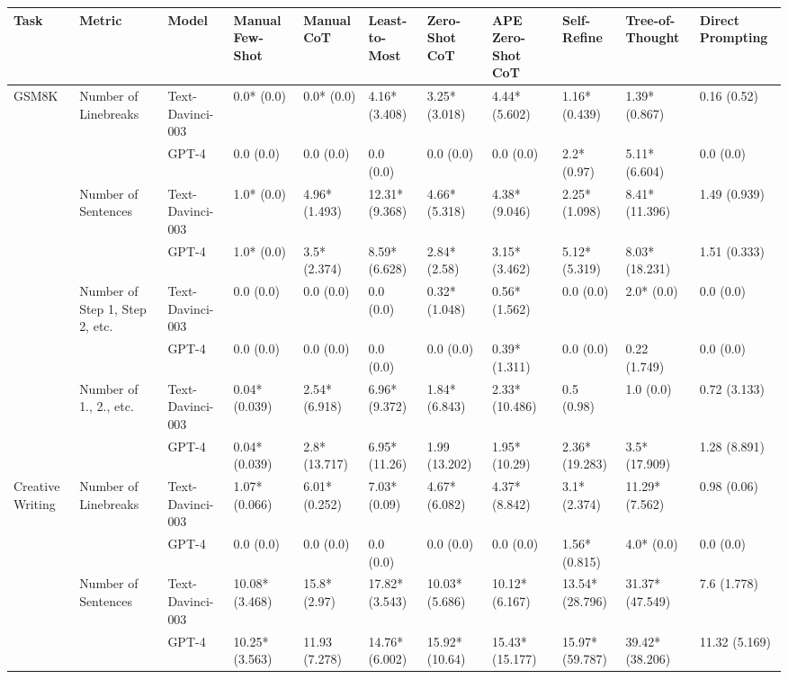 \begin{tabular}{x{0.75cm}|x{1.5cm}|x{0.75cm}|x{0.75cm}|x{0.75cm}|x{0.75cm}|x{0.75cm}|x{0.75cm}|x{0.75cm}|x{0.75cm}|x{0.75cm}}
\toprule
\hline
Task & Metric & Model & Manual Few-Shot & Manual CoT & Least-to-Most & Zero-Shot CoT & APE Zero-Shot CoT & Self-Refine & Tree-of-Thought & Direct Prompting \\
\hline
\midrule
GSM8K & Number of Linebreaks & Text-Davinci-003 & 0.0* (0.0) & 0.0* (0.0) & 4.16* (3.408) & 3.25* (3.018) & 4.44* (5.602) & 1.16* (0.439) & 1.39* (0.867) & 0.16 (0.52) \\
\hline
 &  & GPT-4 & 0.0 (0.0) & 0.0 (0.0) & 0.0 (0.0) & 0.0 (0.0) & 0.0 (0.0) & 2.2* (0.97) & 5.11* (6.604) & 0.0 (0.0) \\
\hline
 & Number of Sentences & Text-Davinci-003 & 1.0* (0.0) & 4.96* (1.493) & 12.31* (9.368) & 4.66* (5.318) & 4.38* (9.046) & 2.25* (1.098) & 8.41* (11.396) & 1.49 (0.939) \\
\hline
 &  & GPT-4 & 1.0* (0.0) & 3.5* (2.374) & 8.59* (6.628) & 2.84* (2.58) & 3.15* (3.462) & 5.12* (5.319) & 8.03* (18.231) & 1.51 (0.333) \\
\hline
 & Number of Step 1, Step 2, etc. & Text-Davinci-003 & 0.0 (0.0) & 0.0 (0.0) & 0.0 (0.0) & 0.32* (1.048) & 0.56* (1.562) & 0.0 (0.0) & 2.0* (0.0) & 0.0 (0.0) \\
\hline
 &  & GPT-4 & 0.0 (0.0) & 0.0 (0.0) & 0.0 (0.0) & 0.0 (0.0) & 0.39* (1.311) & 0.0 (0.0) & 0.22 (1.749) & 0.0 (0.0) \\
\hline
 & Number of 1., 2., etc. & Text-Davinci-003 & 0.04* (0.039) & 2.54* (6.918) & 6.96* (9.372) & 1.84* (6.843) & 2.33* (10.486) & 0.5 (0.98) & 1.0 (0.0) & 0.72 (3.133) \\
\hline
 &  & GPT-4 & 0.04* (0.039) & 2.8* (13.717) & 6.95* (11.26) & 1.99 (13.202) & 1.95* (10.29) & 2.36* (19.283) & 3.5* (17.909) & 1.28 (8.891) \\
\hline
Creative Writing & Number of Linebreaks & Text-Davinci-003 & 1.07* (0.066) & 6.01* (0.252) & 7.03* (0.09) & 4.67* (6.082) & 4.37* (8.842) & 3.1* (2.374) & 11.29* (7.562) & 0.98 (0.06) \\
\hline
 &  & GPT-4 & 0.0 (0.0) & 0.0 (0.0) & 0.0 (0.0) & 0.0 (0.0) & 0.0 (0.0) & 1.56* (0.815) & 4.0* (0.0) & 0.0 (0.0) \\
\hline
 & Number of Sentences & Text-Davinci-003 & 10.08* (3.468) & 15.8* (2.97) & 17.82* (3.543) & 10.03* (5.686) & 10.12* (6.167) & 13.54* (28.796) & 31.37* (47.549) & 7.6 (1.778) \\
\hline
 &  & GPT-4 & 10.25* (3.563) & 11.93 (7.278) & 14.76* (6.002) & 15.92* (10.64) & 15.43* (15.177) & 15.97* (59.787) & 39.42* (38.206) & 11.32 (5.169) \\

\end{tabular}
